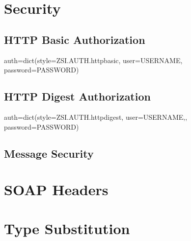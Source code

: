 \chapter{Security}
\section{HTTP Basic Authorization}
auth=dict(style=ZSI.AUTH.httpbasic, user=USERNAME, password=PASSWORD)
\section{HTTP Digest Authorization}
auth=dict(style=ZSI.AUTH.httpdigest, user=USERNAME,, password=PASSWORD)

\section{Message Security}

\chapter{SOAP Headers}
\chapter{Type Substitution}
